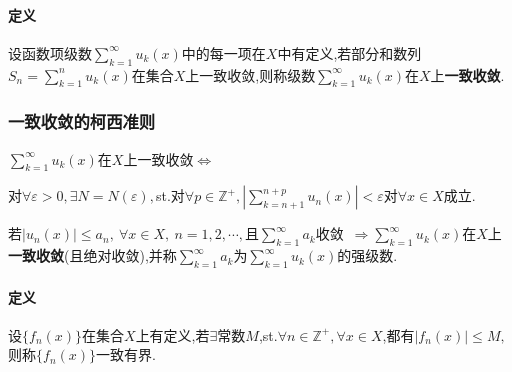 \documentclass[UTF8]{ctexart}
\begin{document}
\begin{tcolorbox}[colframe=green!66!black,title=\subsubsection{函数项级数的一致收敛}]
    \paragraph{定义}设函数项级数$\sum_{k=1}^\infty u_k(x)$中的每一项在$X$中有定义,若部分和数列$S_n=\sum_{k=1}^n u_k(x)$在集合$X$上一致收敛,则称级数$\sum_{k=1}^\infty u_k(x)$在$X$上\textbf{一致收敛}.

\tcblower

    \subsubsection{一致收敛的柯西准则}
    $\sum_{k=1}^\infty u_k(x)$在$X$上一致收敛$\Longleftrightarrow$
        
    \qquad 对$\forall\varepsilon>0,\exists N=N(\varepsilon),$st.对$\forall p\in\mathbb{Z}^+,\left|\sum_{k=n+1}^{n+p}u_n(x)\right|<\varepsilon$对$\forall x\in X$成立.
    \begin{tcolorbox}[colframe=blue,title={\subsubsection{{\color{red}{[函数项级数]}}强级数判别法}}]
        若$|u_n(x)|\leq a_n,\ \forall x\in X,\ n=1,2,\cdots,$且$\sum_{k=1}^\infty a_k$收敛\ $\Longrightarrow\sum_{k=1}^\infty u_k(x)$在$X$上\textbf{一致收敛}(且绝对收敛),并称$\sum_{k=1}^\infty a_k$为$\sum_{k=1}^\infty u_k(x)$的强级数.
    \end{tcolorbox}
\end{tcolorbox}

\begin{tcolorbox}[colframe=green!66!black,title=\subsubsection{一致有界}]
    \paragraph{定义}设$\{f_n(x)\}$在集合$X$上有定义,若$\exists$常数$M$,st.$\forall n\in\mathbb{Z}^+,\forall x\in X$,都有$|f_n(x)|\leq M,$则称$\{f_n(x)\}$一致有界.
\end{tcolorbox}
\end{document}
